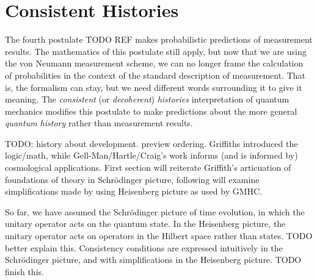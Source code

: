 \usetikzlibrary{shapes.geometric}
\usetikzlibrary{positioning}

\chapter{Consistent Histories}

The fourth postulate TODO REF makes probabilistic predictions of measurement results. The mathematics of this postulate still apply, but now that we are using the von Neumann measurement scheme, we can no longer frame the calculation of probabilities in the context of the standard description of measurement. That is, the formalism can stay, but we need different words surrounding it to give it meaning. The \textit{consistent} (or \textit{decoherent}) \textit{histories} interpretation of quantum mechanics modifies this postulate to make predictions about the more general \textit{quantum history} rather than measurement results.

TODO: history about development. preview ordering. Griffiths introduced the logic/math, while Gell-Man/Hartle/Craig's work informs (and is informed by) cosmological applications. First section will reiterate Griffith's articuation of foundations of theory in Schrödinger picture, following will examine simplifications made by using Heisenberg picture as used by GMHC.

So far, we have assumed the Schrödinger picture of time evolution, in which the unitary operator acts on the quantum state. In the Heisenberg picture, the unitary operator acts on operators in the Hilbert space rather than states. TODO better explain this.
Consistency conditions are expressed intuitively in the Schrödinger picture, and with simplifications in the Heisenberg picture. TODO finish this.


%

